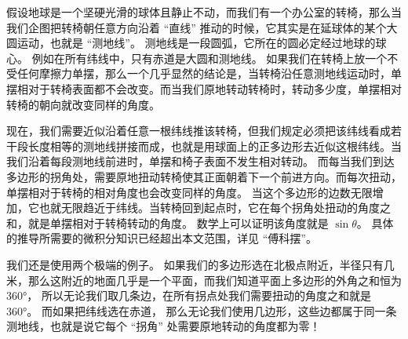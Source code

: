 假设地球是一个坚硬光滑的球体且静止不动，而我们有一个办公室的转椅，那么当我们企图把转椅朝任意方向沿着 “直线” 推动的时候，它其实是在延球体的某个大圆运动，也就是 “测地线”。 测地线是一段圆弧，它所在的圆必定经过地球的球心。 例如在所有纬线中，只有赤道是大圆和测地线。 如果我们在转椅上放一个不受任何摩擦力单摆，那么一个几乎显然的结论是，当转椅沿任意测地线运动时，单摆相对于转椅表面都不会改变。而当我们原地转动转椅时，转动多少度，单摆相对转椅的朝向就改变同样的角度。

现在，我们需要近似沿着任意一根纬线推该转椅，但我们规定必须把该纬线看成若干段长度相等的测地线拼接而成，也就是用球面上的正多边形去近似这根纬线。当我们沿着每段测地线前进时，单摆和椅子表面不发生相对转动。 而每当我们到达多边形的拐角处，需要原地扭动转椅使其正面朝着下一个前进方向。而每次扭动，单摆相对于转椅的相对角度也会改变同样的角度。 当这个多边形的边数无限增加，它也就无限趋近于纬线。当转椅回到起点时，它在每个拐角处扭动的角度之和，就是单摆相对于转椅转动的角度。 数学上可以证明该角度就是 $\sin\theta$。 具体的推导所需要的微积分知识已经超出本文范围，详见 “傅科摆”。

我们还是使用两个极端的例子。 如果我们的多边形选在北极点附近，半径只有几米，那么这附近的地面几乎是一个平面，而我们知道平面上多边形的外角之和恒为 360°， 所以无论我们取几条边，在所有拐点处我们需要扭动的角度之和就是 360°。 而如果把纬线选在赤道， 那么无论我们使用几边形，这些边都属于同一条测地线，也就是说它每个 “拐角” 处需要原地转动的角度都为零！
